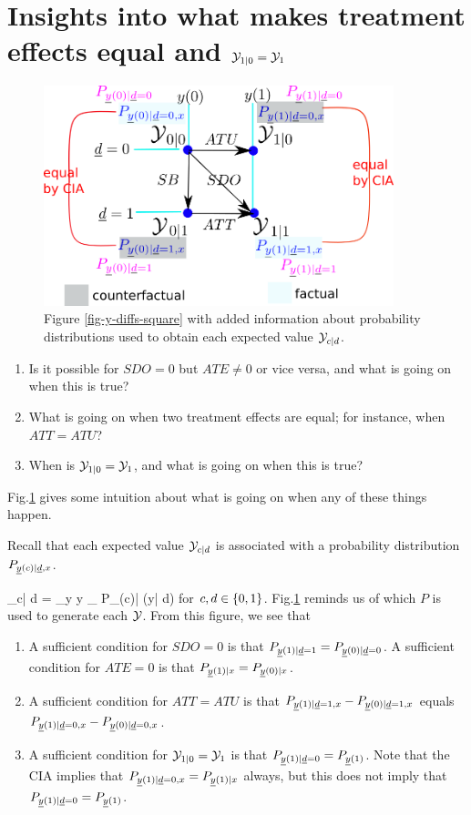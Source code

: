 \section{Insights into 
what makes treatment effects equal and 
${\cal Y}_{1|0}={\cal Y}_{1}$}
\label{sec-td-ignored}

\begin{figure}[h!]
\centering
\includegraphics[width=4in]
{pot-out/y-diffs-square-probs.png}
\caption{Figure \ref{fig-y-diffs-square} 
with added information
about  probability distributions 
used to obtain each expected value
 ${\cal Y}_{c| d }$.}
\label{fig-y-diffs-square-probs}
\end{figure}


\begin{enumerate}
\item 
Is it
possible for $SDO=0$ but $ATE\neq 0$
or vice versa, and
what is going on when this is true?
\item
What is going on when two treatment effects
are equal; for instance, when $ATT=ATU$?
\item
When is ${\cal Y}_{1|0}={\cal Y}_{1}$,
and what is going on when this is  true?
\end{enumerate}
Fig.\ref{fig-y-diffs-square-probs}
gives some 
intuition 
about what is
going on when any of these 
things happen.

Recall that
each expected value
${\cal Y}_{c|d}$ 
is associated with a probability
distribution $P_{{\underline{y}}(c)|{\underline{d}},x}$.

\beq
\caly_{c| d }
=
\sum_{y} y 
_{
P_{\rvy(c)| \rvd}(y| d)}
\eeq
for $c,  d\in \{0,1\}$.
Fig.\ref{fig-y-diffs-square-probs}
reminds us of which $P$
is used to generate each ${\cal Y}$.
From this figure, we see that

\begin{enumerate}
\item
A sufficient
condition for $SDO=0$
is that 
$P_{{\underline{y}}(1)| {\underline{d}}=1}
=
P_{{\underline{y}}(0)| {\underline{d}}=0}$.
A sufficient
condition for $ATE=0$
is that 
$P_{{\underline{y}}(1)|x}
=
P_{{\underline{y}}(0)|x}$.

\item
A sufficient condition for
$ATT=ATU$
is that 
$P_{{\underline{y}}(1)| {\underline{d}}=1,x}
-
P_{{\underline{y}}(0)| {\underline{d}}=1,x}$
equals
$P_{{\underline{y}}(1)| {\underline{d}}=0,x}
-
P_{{\underline{y}}(0)| {\underline{d}}=0,x}$.
\item
A sufficient condition for ${\cal Y}_{1|0}={\cal Y}_{1}$
is that
$P_{{\underline{y}}(1)| {\underline{d}}=0}=
P_{{\underline{y}}(1)}$. Note that
the CIA implies that 
$P_{{\underline{y}}(1)| {\underline{d}}=0,x}=
P_{{\underline{y}}(1)|x}$ always,
but this does not imply that
$P_{{\underline{y}}(1)| {\underline{d}}=0}=
P_{{\underline{y}}(1)}$.
\end{enumerate}


